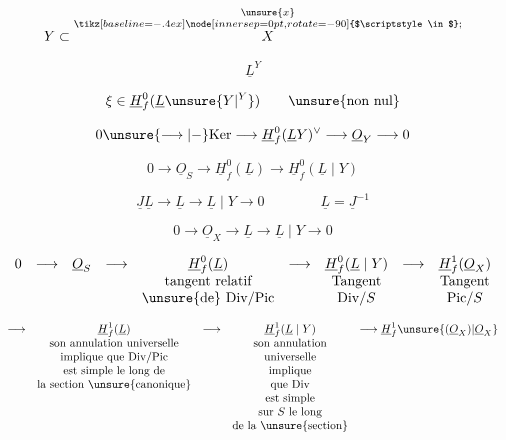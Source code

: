 
\[
Y\subset\overset{\substack{\unsure{x}\\\tikz[baseline=-.4ex]\node[inner sep=0pt,rotate=-90] {$\scriptstyle\in$};}}{X}
\]


\[
\underline L^{Y}
\]

\[
\xi\in\underline H^{0}_{f}(\underline L\unsure{Y|^{Y}})\qquad\text{\unsure{non nul}}
\]

\[
0\unsure{\longrightarrow|\mathord{-}}\mathrm{Ker}\longrightarrow\underline H^{0}_{f}(\underline L Y)^{\vee}\longrightarrow\underline O_Y\longrightarrow 0
\]

\[
0\longrightarrow\underline O_S\longrightarrow\underline H^{0}_{f}(\underline L)\longrightarrow\underline H^{0}_{f}(\underline L\mid Y)
\]

\[
\underline J\underline L\longrightarrow\underline L\longrightarrow\underline L\mid Y\longrightarrow0
\qquad\qquad \underline L=\underline J^{-1}
\]

\[
0\longrightarrow\underline O_X\longrightarrow\underline L\longrightarrow\underline L\mid Y\longrightarrow0
\]

\[
\begin{array}{ccccccccc}
0&\longrightarrow&\underline O_S&\longrightarrow&\underline H^0_f(\underline L)&\longrightarrow&\underline H^0_f(\underline L\mid Y)&\longrightarrow&\underline H^1_f(\underline O_X)\\
&&&&\text{tangent relatif}&&\text{Tangent}&&\text{Tangent}\\
&&&&\text{\unsure{de} }\mathrm{Div}/\mathrm{Pic}&&\mathrm{Div}/S&&\mathrm{Pic}/S
\end{array}
\]

\[
\begin{array}{rclcl}
\longrightarrow&\underline H^1_f(\underline L)&\longrightarrow&\underline H^1_f(\underline L\mid Y)&\longrightarrow\underline H^{1}_f\unsure{(\underline O_X)|\underline O_X}\\
&\text{son annulation universelle}&&\text{son annulation}&\\
&\text{implique que }\mathrm{Div}/\mathrm{Pic}&&\text{universelle}&\\
&\text{est simple le long de}&&\text{implique}&\\
&\text{la section \unsure{canonique}}&&\text{que }\mathrm{Div}&\\
&&&\text{est simple}&\\
&&&\text{sur }S\text{ le long}&\\
&&&\text{de la \unsure{section}}&
\end{array}
\]

